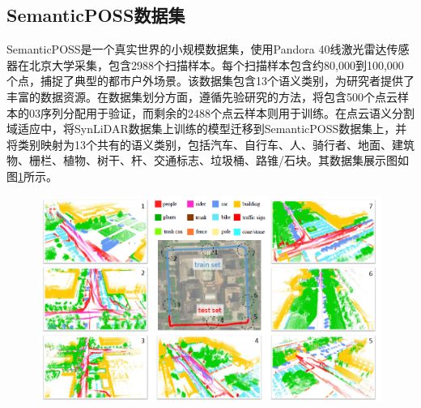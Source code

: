 \subsection{SemanticPOSS数据集}
SemanticPOSS是一个真实世界的小规模数据集，使用Pandora 40线激光雷达传感器在北京大学采集，包含2988个扫描样本。每个扫描样本包含约80,000到100,000个点，捕捉了典型的都市户外场景。该数据集包含13个语义类别，为研究者提供了丰富的数据资源。在数据集划分方面，遵循先验研究的方法，将包含500个点云样本的03序列分配用于验证，而剩余的2488个点云样本则用于训练。在点云语义分割域适应中，将SynLiDAR数据集上训练的模型迁移到SemanticPOSS数据集上，并将类别映射为13个共有的语义类别，包括汽车、自行车、人、骑行者、地面、建筑物、栅栏、植物、树干、杆、交通标志、垃圾桶、路锥/石块。其数据集展示图如图\ref{fig:2-5}所示。
\begin{figure}[h]
    \centering
    \includegraphics[width = \textwidth, scale=0.5]{ljx/figure/2-5/poss.png}
    \label{fig:2-5}
    \vspace{-0.5cm} 
\end{figure}
